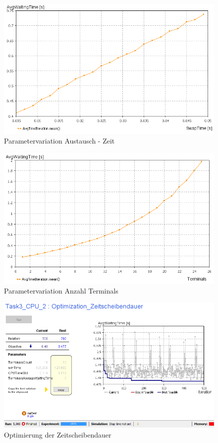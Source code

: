 \documentclass[
a4paper,   
headsepline, 
fleqn,     
11pt
]{scrartcl}
\begin{document}
\begin{figure}[h]
  \centering
  \includegraphics[width=1\textwidth]{./images/ParameterVariationSwapTime}
  \caption{Parametervariation Austausch - Zeit}
  \label{fig:SwapTime}
\end{figure}

\begin{figure}[h]
  \centering
  \includegraphics[width=1\textwidth]{./images/ParameterVariationTerminals}
  \caption{Parametervariation Anzahl Terminals}
  \label{fig:TerminalCount}
\end{figure}

\begin{figure}[h]
  \centering
  \includegraphics[width=1\textwidth]{./images/Optimization}
  \caption{Optimierung der Zeitscheibendauer}
  \label{fig:OptimizationC}
\end{figure}

\appendix  


\end{document}
